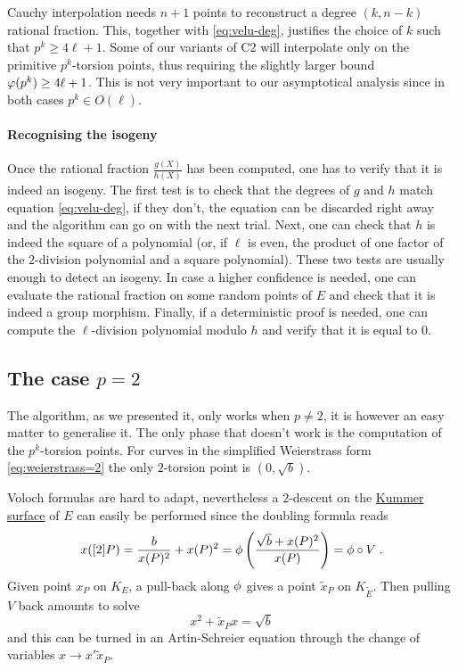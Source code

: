 Cauchy interpolation needs $n+1$ points to reconstruct a degree
$(k,n-k)$ rational fraction. This, together with \eqref{eq:velu-deg},
justifies the choice of $k$ such that $p^k \ge 4\ell+1$. Some of our
variants of C2 will interpolate only on the primitive $p^k$-torsion
points, thus requiring the slightly larger bound $\varphi(p^k) \ge
4\ell+1$. This is not very important to our asymptotical analysis
since in both cases $p^k \in O(\ell)$.

\paragraph{Recognising the isogeny}
Once the rational fraction $\frac{g(X)}{h(X)}$ has been computed, one
has to verify that it is indeed an isogeny. The first test is to check
that the degrees of $g$ and $h$ match equation \eqref{eq:velu-deg}, if
they don't, the equation can be discarded right away and the algorithm
can go on with the next trial. Next, one can check that $h$ is indeed
the square of a polynomial (or, if $\ell$ is even, the product of one
factor of the $2$-division polynomial and a square polynomial). These
two tests are usually enough to detect an isogeny. In case a higher
confidence is needed, one can evaluate the rational fraction on some
random points of $E$ and check that it is indeed a group
morphism. Finally, if a deterministic proof is needed, one can compute
the $\ell$-division polynomial modulo $h$ and verify that it is equal
to $0$.


\subsection{The case $p=2$}
\label{sec:p=2}
The algorithm, as we presented it, only works when $p\ne2$, it is
however an easy matter to generalise it. The only phase that doesn't
work is the computation of the $p^k$-torsion points. For curves in the
simplified Weierstrass form \eqref{eq:weierstrass=2} the only
$2$-torsion point is $(0,\sqrt{b})$.

Voloch formulas are hard to adapt, nevertheless a $2$-descent on the
\hyperref[def:kummer]{Kummer surface} of $E$ can easily be performed
since the doubling formula reads
\begin{equation}
  x([2]P) = \frac{b}{x(P)^2} + x(P)^2 =
  \phi\left(\frac{\sqrt{b} + x(P)^2}{x(P)} \right) = \phi\circ V
  \;\text{.}
\end{equation}
Given point $x_P$ on $K_E$, a pull-back along $\phi$ gives a
point $\tilde{x}_P$ on $K_{\widetilde{E}}$. Then pulling $V$ back
amounts to solve
\begin{equation}
  \label{eq:2-descent}
  x^2 + \tilde{x}_Px = \sqrt{b}
\end{equation}
and this can be turned in an Artin-Schreier equation through the
change of variables $x \rightarrow x'\tilde{x}_P$.


